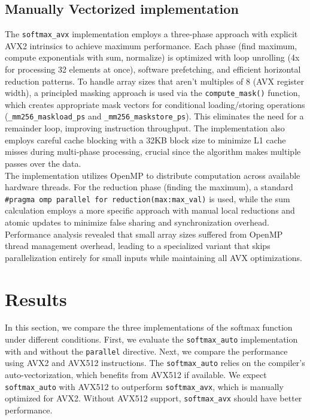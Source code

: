 \documentclass[10pt]{article}
\begin{document}
\subsection{Manually Vectorized implementation}
The \texttt{softmax\_avx} implementation employs a three-phase approach with explicit AVX2 intrinsics to achieve maximum performance. Each phase (find maximum, compute exponentials with sum, normalize) is optimized with loop unrolling (4x for processing 32 elements at once), software prefetching, and efficient horizontal reduction patterns. To handle array sizes that aren't multiples of 8 (AVX register width), a principled masking approach is used via the \texttt{compute\_mask()} function, which creates appropriate mask vectors for conditional loading/storing operations (\texttt{\_mm256\_maskload\_ps} and \texttt{\_mm256\_maskstore\_ps}). This eliminates the need for a remainder loop, improving instruction throughput. The implementation also employs careful cache blocking with a 32KB block size to minimize L1 cache misses during multi-phase processing, crucial since the algorithm makes multiple passes over the data. \\

The implementation utilizes OpenMP to distribute computation across available hardware threads. For the reduction phase (finding the maximum), a standard \texttt{\#pragma omp parallel for reduction(max:max\_val)} is used, while the sum calculation employs a more specific approach with manual local reductions and atomic updates to minimize false sharing and synchronization overhead. Performance analysis revealed that small array sizes suffered from OpenMP thread management overhead, leading to a specialized variant that skips parallelization entirely for small inputs while maintaining all AVX optimizations.

\section{Results}
In this section, we compare the three implementations of the softmax function under different conditions. First, we evaluate the \texttt{softmax\_auto} implementation with and without the \texttt{parallel} directive. Next, we compare the performance using AVX2 and AVX512 instructions. The \texttt{softmax\_auto} relies on the compiler's auto-vectorization, which benefits from AVX512 if available. We expect \texttt{softmax\_auto} with AVX512 to outperform \texttt{softmax\_avx}, which is manually optimized for AVX2. Without AVX512 support, \texttt{softmax\_avx} should have better performance.
\end{document}
